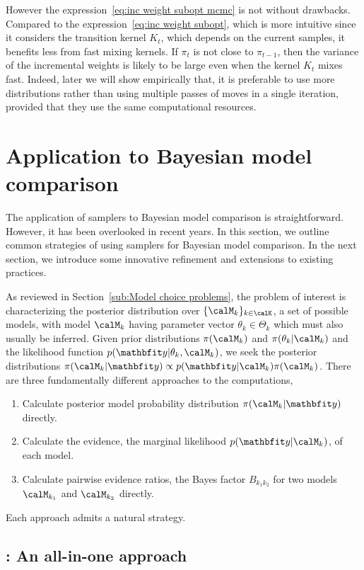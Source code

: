 However the expression~\eqref{eq:inc weight subopt mcmc} is not without drawbacks. Compared to the expression~\eqref{eq:inc weight subopt}, which is more intuitive since it considers the transition kernel $K_t$, which depends on the current samples, it benefits less from fast mixing kernels. If $\pi_t$ is not close to $\pi_{t-1}$, then the variance of the incremental weights is likely to be large even when the kernel $K_t$ mixes fast. Indeed, later we will show empirically that, it is preferable to use more distributions rather than using multiple passes of \mcmc moves in a single iteration, provided that they use the same computational resources.

\section{Application to Bayesian model comparison}
\label{sec:Application to Bayesian model comparison}

The application of \smc samplers to Bayesian model comparison is straightforward. However, it has been overlooked in recent years. In this section, we outline common strategies of using \smc samplers for Bayesian model comparison. In the next section, we introduce some innovative refinement and extensions to existing practices.

As reviewed in Section~\ref{sub:Model choice problems}, the problem of interest is characterizing the posterior distribution over $\{\calM_k\}_{k\in\calK}$, a set of possible models, with model $\calM_k$ having parameter vector $\theta_k\in\Theta_k$ which must also usually be inferred. Given prior distributions $\pi(\calM_k)$ and $\pi(\theta_k|\calM_k)$ and the likelihood function $p(\data|\theta_k,\calM_k)$, we seek the posterior distributions $\pi(\calM_k|\data)\propto p(\data|\calM_k)\pi(\calM_k)$. There are three fundamentally different approaches to the computations,
\begin{enumerate}
  \item Calculate posterior model probability distribution $\pi(\calM_k|\data)$ directly.
  \item Calculate the evidence, the marginal likelihood $p(\data|\calM_k)$, of each model.
  \item Calculate pairwise evidence ratios, the Bayes factor $B_{k_1k_2}$ for two models $\calM_{k_1}$ and $\calM_{k_2}$ directly.
\end{enumerate}
Each approach admits a natural \smc strategy.

\subsection[SMC1: An all-in-on approach]{\smc[1]: An all-in-one approach}
\label{sub:smc1: An all-in-one approach}


